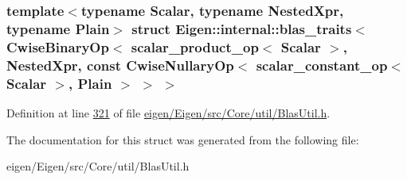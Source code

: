 \subsubsection*{template$<$typename Scalar, typename Nested\+Xpr, typename Plain$>$\newline
struct Eigen\+::internal\+::blas\+\_\+traits$<$ Cwise\+Binary\+Op$<$ scalar\+\_\+product\+\_\+op$<$ Scalar $>$, Nested\+Xpr, const Cwise\+Nullary\+Op$<$ scalar\+\_\+constant\+\_\+op$<$ Scalar $>$, Plain $>$ $>$ $>$}



Definition at line \hyperlink{eigen_2_eigen_2src_2_core_2util_2_blas_util_8h_source_l00321}{321} of file \hyperlink{eigen_2_eigen_2src_2_core_2util_2_blas_util_8h_source}{eigen/\+Eigen/src/\+Core/util/\+Blas\+Util.\+h}.



The documentation for this struct was generated from the following file\+:\begin{DoxyCompactItemize}
\item 
eigen/\+Eigen/src/\+Core/util/\+Blas\+Util.\+h\end{DoxyCompactItemize}
